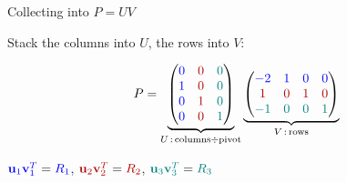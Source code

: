 \documentclass[10pt]{beamer}
\theoremstyle{definition}
\newcommand{\bl}[1]{{\color{blue}#1}}                 %
\newcommand{\rd}[1]{{\color{red!70!black}#1}}         %
\newcommand{\tl}[1]{{\color{teal}#1}}                 %
\begin{document}
\begin{frame}{Collecting into $P = UV$}

Stack the columns into $U$, the rows into $V$:

$$P = \underbrace{\begin{pmatrix} \bl{0} & \rd{0} & \tl{0} \\ \bl{1} & \rd{0} & \tl{0} \\ \bl{0} & \rd{1} & \tl{0} \\ \bl{0} & \rd{0} & \tl{1} \end{pmatrix}}_{U\,:\, \text{columns} \div \text{pivot}} \underbrace{\begin{pmatrix} \bl{-2} & \bl{1} & \bl{0} & \bl{0} \\ \rd{1} & \rd{0} & \rd{1} & \rd{0} \\ \tl{-1} & \tl{0} & \tl{0} & \tl{1} \end{pmatrix}}_{V\,:\, \text{rows}}$$

\vspace{0.3em}

$\bl{\mathbf{u}_1}\bl{\mathbf{v}_1^T} = \bl{R_1}$, \quad $\rd{\mathbf{u}_2}\rd{\mathbf{v}_2^T} = \rd{R_2}$, \quad $\tl{\mathbf{u}_3}\tl{\mathbf{v}_3^T} = \tl{R_3}$

\end{frame}
\end{document}
